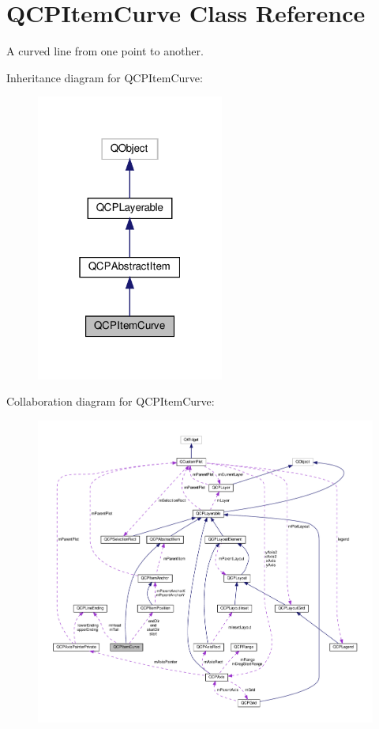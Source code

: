 \hypertarget{classQCPItemCurve}{}\section{Q\+C\+P\+Item\+Curve Class Reference}
\label{classQCPItemCurve}


A curved line from one point to another.  




Inheritance diagram for Q\+C\+P\+Item\+Curve\+:\nopagebreak
\begin{figure}[H]
\begin{center}
\leavevmode
\includegraphics[width=175pt]{classQCPItemCurve__inherit__graph}
\end{center}
\end{figure}


Collaboration diagram for Q\+C\+P\+Item\+Curve\+:\nopagebreak
\begin{figure}[H]
\begin{center}
\leavevmode
\includegraphics[width=350pt]{classQCPItemCurve__coll__graph}
\end{center}
\end{figure}
